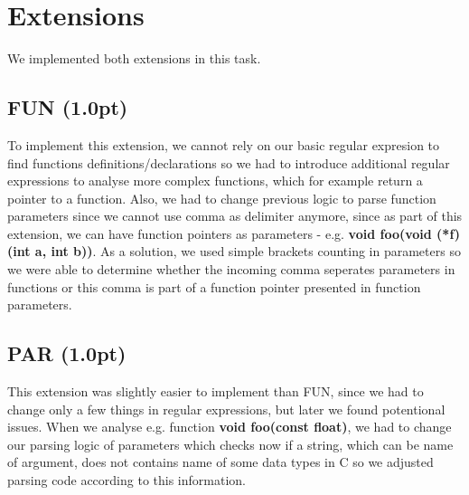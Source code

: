 \documentclass[10pt,a4paper]{article}
\begin{document}
\section{Extensions}
	We implemented both extensions in this task.

	\subsection{FUN (1.0pt)}
		To implement this extension, we cannot rely on our basic regular expresion to find functions definitions/declarations so we had to introduce additional regular expressions to analyse more complex functions, which for example return a pointer to a function. Also, we had to change previous logic to parse function parameters since we cannot use comma as delimiter anymore, since as part of this extension, we can have function pointers as parameters - e.g. \textbf{void foo(void (*f)(int a, int b))}. As a solution, we used simple brackets counting in parameters so we were able to determine whether the incoming comma seperates parameters in functions or this comma is part of a function pointer presented in function parameters.
		
	\subsection{PAR (1.0pt)}
	        This extension was slightly easier to implement than FUN, since we had to change only a few things in regular expressions, but later we found potentional issues. When we analyse e.g. function \textbf{void foo(const float)}, we had to change our parsing logic of parameters which checks now if a string, which can be name of argument, does not contains name of some data types in C so we adjusted parsing code according to this information.
\end{document}
